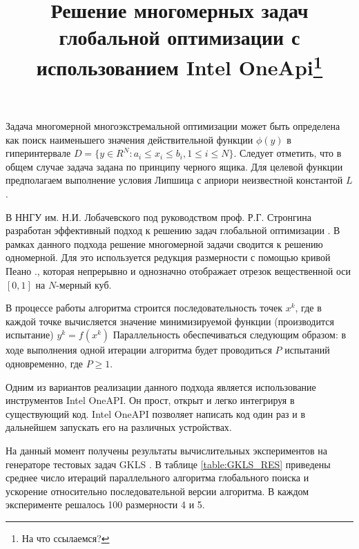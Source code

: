 \documentclass[11pt, oneside, a4paper]{article}
\begin{document}

\title{Решение многомерных задач глобальной оптимизации с использованием Intel OneApi\footnote{На что ссылаемся?}}



Задача многомерной многоэкстремальной оптимизации может быть определена как поиск наименьшего значения действительной функции \(\phi(y)\)  в гиперинтервале \(D=\{y\in R^N:a_i\leqslant x_i\leqslant{b_i}, 1\leqslant{i}\leqslant{N}\}\). 
Следует отметить, что в общем случае задача задана по принципу черного ящика. Для целевой функции предполагаем выполнение условия Липшица с априори неизвестной константой \(L\).

В ННГУ им. Н.И. Лобачевского под руководством проф. Р.Г. Стронгина разработан эффективный подход к решению задач глобальной оптимизации \cite{Strongin2013}. В рамках данного подхода решение многомерной задачи сводится к решению одномерной. Для это используется редукция размерности с помощью кривой Пеано \cite{Sergeyev2013}., которая непрерывно и однозначно отображает отрезок вещественной оси \([0,1]\) на  \(N\)-мерный куб.


В процессе работы алгоритма строится последовательность точек \(x^k\), где в каждой точке вычисляется значение минимизируемой функции (производится испытание) \(y^k=f(x^k)\)  Параллельность обеспечиваться следующим образом: в ходе выполнения одной итерации алгоритма будет проводиться \(P\) испытаний одновременно, где \(P \geq 1\).

Одним из вариантов реализации данного подхода является использование инструментов Intel OneAPI. Он прост, открыт и легко интегрируя в существующий код. Intel OneAPI позволяет написать код один раз и в дальнейшем запускать его на различных устройствах. 


На данный момент получены результаты вычислительных экспериментов на генераторе тестовых задач GKLS \cite{GKLS}. В таблице \ref{table:GKLS_RES} приведены среднее число итераций параллельного алгоритма глобального поиска и ускорение относительно последовательной версии алгоритма. В каждом эксперименте решалось 100 размерности 4 и 5.
\end{document}
